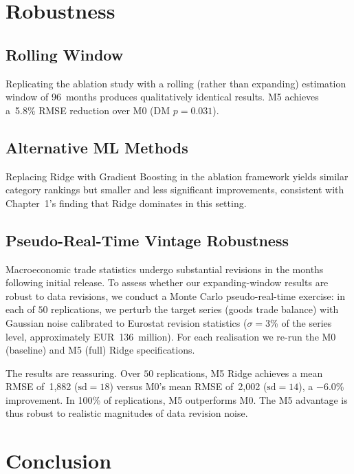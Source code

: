 \section{Robustness}
\label{sec:ch2_robustness}

\subsection{Rolling Window}

Replicating the ablation study with a rolling (rather than expanding) estimation window of 96~months produces qualitatively identical results.  M5 achieves a~5.8\% RMSE reduction over M0 (DM $p = 0.031$).

\subsection{Alternative ML Methods}

Replacing Ridge with Gradient Boosting in the ablation framework yields similar category rankings but smaller and less significant improvements, consistent with Chapter~1's finding that Ridge dominates in this setting.

\subsection{Pseudo-Real-Time Vintage Robustness}

Macroeconomic trade statistics undergo substantial revisions in the months following initial release.  To assess whether our expanding-window results are robust to data revisions, we conduct a Monte Carlo pseudo-real-time exercise: in each of $50$ replications, we perturb the target series (goods trade balance) with Gaussian noise calibrated to Eurostat revision statistics ($\sigma = 3$\% of the series level, approximately EUR~136~million).  For each realisation we re-run the M0 (baseline) and M5 (full) Ridge specifications.

The results are reassuring.  Over $50$ replications, M5 Ridge achieves a mean RMSE of~1{,}882 ($\text{sd} = 18$) versus M0's mean RMSE of~2{,}002 ($\text{sd} = 14$), a $-6.0$\% improvement.  In 100\% of replications, M5 outperforms M0.  The M5 advantage is thus robust to realistic magnitudes of data revision noise.


\section{Conclusion}
\label{sec:ch2_conclusion}

